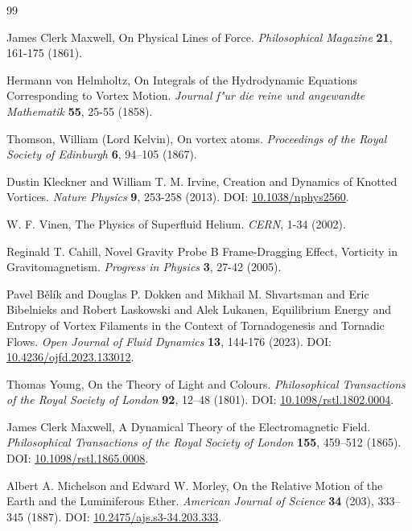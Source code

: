 \documentclass[a4paper,10pt]{article}
\begin{document}
\begin{thebibliography}{99}

James Clerk Maxwell,
\newblock On Physical Lines of Force.
\textit{Philosophical Magazine} \textbf{21}, 161-175 (1861).


Hermann von Helmholtz,
\newblock On Integrals of the Hydrodynamic Equations Corresponding to Vortex Motion.
\textit{Journal f{"u}r die reine und angewandte Mathematik} \textbf{55}, 25-55 (1858).


Thomson, William (Lord Kelvin),
\newblock On vortex atoms.
\textit{Proceedings of the Royal Society of Edinburgh} \textbf{6}, 94--105 (1867).


Dustin Kleckner and William T. M. Irvine,
\newblock Creation and Dynamics of Knotted Vortices.
\textit{Nature Physics} \textbf{9}, 253-258 (2013).
\newblock DOI: \href{https://doi.org/10.1038/nphys2560}{10.1038/nphys2560}.


W. F. Vinen,
\newblock The Physics of Superfluid Helium.
\textit{CERN}, 1-34 (2002).


Reginald T. Cahill,
\newblock Novel Gravity Probe B Frame-Dragging Effect, Vorticity in Gravitomagnetism.
\textit{Progress in Physics} \textbf{3}, 27-42 (2005).


Pavel Bělík and Douglas P. Dokken and Mikhail M. Shvartsman and Eric Bibelnieks and Robert Laskowski and Alek Lukanen,
\newblock Equilibrium Energy and Entropy of Vortex Filaments in the Context of Tornadogenesis and Tornadic Flows.
\textit{Open Journal of Fluid Dynamics} \textbf{13}, 144-176 (2023).
\newblock DOI: \href{https://doi.org/10.4236/ojfd.2023.133012}{10.4236/ojfd.2023.133012}.


Thomas Young,
\newblock On the Theory of Light and Colours.
\textit{Philosophical Transactions of the Royal Society of London} \textbf{92}, 12--48 (1801).
\newblock DOI: \href{https://doi.org/10.1098/rstl.1802.0004}{10.1098/rstl.1802.0004}.


James Clerk Maxwell,
\newblock A Dynamical Theory of the Electromagnetic Field.
\textit{Philosophical Transactions of the Royal Society of London} \textbf{155}, 459--512 (1865).
\newblock DOI: \href{https://doi.org/10.1098/rstl.1865.0008}{10.1098/rstl.1865.0008}.


Albert A. Michelson and Edward W. Morley,
\newblock On the Relative Motion of the Earth and the Luminiferous Ether.
\textit{American Journal of Science} \textbf{34} (203), 333--345 (1887).
\newblock DOI: \href{https://doi.org/10.2475/ajs.s3-34.203.333}{10.2475/ajs.s3-34.203.333}.



\end{thebibliography}
\end{document}
